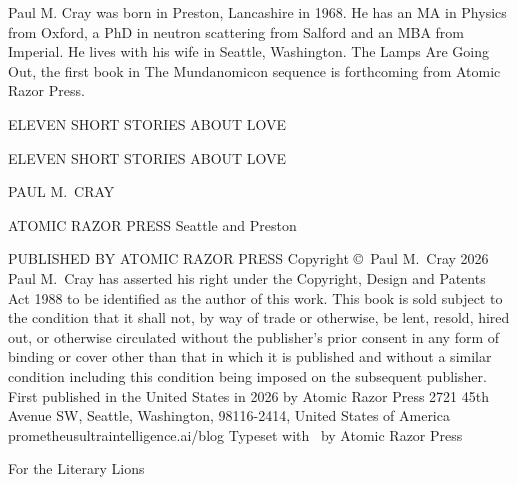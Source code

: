 \startcentered
\frontmattergap
Paul M. Cray was born in Preston, Lancashire in 1968.
He has an MA in Physics from Oxford,
a PhD in neutron scattering from Salford and an MBA from Imperial.
He lives with his wife in Seattle, Washington.
{\twelvesl The Lamps Are Going Out}, the first book in {\twelvesl The Mundanomicon\/} sequence is forthcoming from Atomic Razor Press.
\stopcentered

\blankpage

\startcentered
\frontmattergap
{\twelvess ELEVEN SHORT STORIES ABOUT LOVE}
\stopcentered

\blankpage

\startcentered
\frontmattergap
{\seventeenss ELEVEN SHORT STORIES ABOUT LOVE\par}
\titlegap
{\seventeenss PAUL M.~CRAY\par}
\publishergap
{\twelvebf ATOMIC RAZOR PRESS}
{\twelvebf Seattle and Preston}
\stopcentered

\startcentered
\twelverm
PUBLISHED BY ATOMIC RAZOR PRESS
\copyrightgap
Copyright \copyright\ Paul M.~Cray 2026
\copyrightgap
Paul M.~Cray has asserted his right under the Copyright, Design
and Patents Act 1988 to be identified as the author of this work.
\copyrightgap
{\twelveit This book is sold subject to the condition that it shall not, by way of}
{\twelveit trade or otherwise, be lent, resold, hired out, or otherwise circulated}
{\twelveit without the publisher's prior consent in any form of binding or cover}
{\twelveit other than that in which it is published and without a similar condition}
{\twelveit including this condition being imposed on the subsequent publisher.}
\copyrightgap
First published in the United States in 2026 by
Atomic Razor Press
2721 45th Avenue SW, Seattle, Washington, 98116-2414,
United States of America
\copyrightgap
prometheusultraintelligence.ai/blog
\copyrightgap
Typeset with \OpTeX\ by Atomic Razor Press
\stopcentered

\startcentered
\frontmattergap
{\twelveit For the Literary Lions}
\stopcentered

\blankpage
